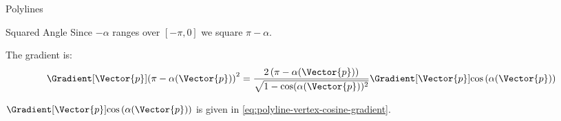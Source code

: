 \begin{plSection}{Polylines}
\begin{plSection}{Squared Angle}
Since $-\alpha$ ranges over $[-\pi,0]$
we square $\pi-\alpha$.

The gradient is:
\begin{equation}
\Gradient[\Vector{p}]{\left( \pi-\alpha(\Vector{p}) \right)^2}
=
\frac{2 \left( \pi-\alpha(\Vector{p}) \right)}
{\sqrt{ 1-\cos(\alpha(\Vector{p}))^2}}
\Gradient[\Vector{p}]{\cos\left(\alpha(\Vector{p})\right)}
\end{equation}

$\Gradient[\Vector{p}]{\cos \left( \alpha(\Vector{p}) \right)}$ is given
in \cref{eq:polyline-vertex-cosine-gradient}.

\end{plSection}%
\end{plSection}%
